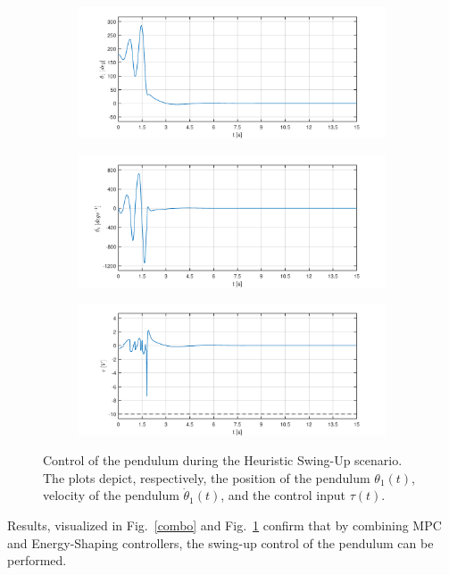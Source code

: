 \begin{figure}[H]
	\centering
	\begin{subfigure}
		\centering
		\includegraphics[scale=0.6]{images/Hswing/pend.pdf}  
	\end{subfigure}
	\begin{subfigure}
		\centering
		\includegraphics[scale=0.6]{images/Hswing/dpend.pdf}  
	\end{subfigure}
	\begin{subfigure}
		\centering
		\includegraphics[scale=0.6]{images/Hswing/control.pdf}  
	\end{subfigure}
	\caption{Control of the pendulum during the Heuristic Swing-Up scenario. The plots depict, respectively, the position of the pendulum $\theta_1(t)$, velocity of the pendulum $\dot{\theta}_1(t)$, and the control input $\tau(t)$.}
	\label{combo1}
\end{figure}
Results, visualized in Fig.~\ref{combo} and Fig.~\ref{combo1} confirm that by combining MPC and Energy-Shaping controllers, the swing-up control of the pendulum can be performed.
